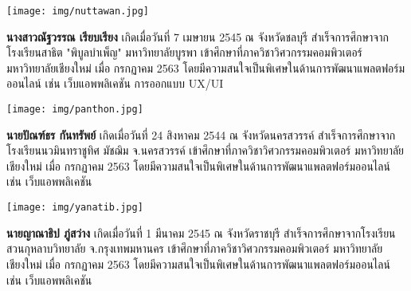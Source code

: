\documentclass[final]{cpecmu}
\author{นายญาณาธิป ภู่สว่าง}{Yanatip Bhoosawang}{630612097}
\author{นางสาวณัฐวรรณ เรียบเรียง}{Nuttawan Reabreang}{630612099}
\author{นายปัณฑ์ธร กันทรัพย์}{Panthon Kansap}{630612105}
\begin{document}


\pagestyle{empty}\cleardoublepage
\normalspacing \setcounter{page}{1}  \pagestyle{cpecmu}






\ifproject

\fi



\ifproject
\normalspacing
\appendix


\ifglossary\glossarypage\fi

\ifindex\indexpage\fi

\begin{biosketch}
\begin{center}
  \texttt{[image: img/nuttawan.jpg]}
\end{center}
\textbf{นางสาวณัฐวรรณ เรียบเรียง} เกิดเมื่อวันที่ 7 เมษายน 2545 ณ จังหวัดชลบุรี สําเร็จการศึกษาจากโรงเรียนสาธิต "พิบูลบำเพ็ญ" มหาวิทยาลัยบูรพา เข้าศึกษาที่ภาควิชาวิศวกรรมคอมพิวเตอร์ มหาวิทยาลัยเชียงใหม่ เมื่อ กรกฏาคม 2563 โดยมีความสนใจเป็นพิเศษในด้านการพัฒนาแพลตฟอร์มออนไลน์ เช่น เว็บแอพพลิเคชัน การออกแบบ UX/UI

\begin{center}
  \texttt{[image: img/panthon.jpg]}
\end{center}
\textbf{นายปัณฑ์ธร กันทรัพย์} เกิดเมื่อวันที่ 24 สิงหาคม 2544 ณ จังหวัดนครสวรรค์ สําเร็จการศึกษาจากโรงเรียนนวมินทราชูทิศ มัชฌิม จ.นครสวรรค์ เข้าศึกษาที่ภาควิชาวิศวกรรมคอมพิวเตอร์ มหาวิทยาลัยเชียงใหม่ เมื่อ กรกฏาคม 2563 โดยมีความสนใจเป็นพิเศษในด้านการพัฒนาแพลตฟอร์มออนไลน์ เช่น เว็บแอพพลิเคชัน

\begin{center}
  \texttt{[image: img/yanatib.jpg]}
\end{center}
\textbf{นายญาณาธิป ภู่สว่าง} เกิดเมื่อวันที่ 1 มีนาคม 2545 ณ จังหวัดราชบุรี สำเร็จการศึกษาจากโรงเรียนสวนกุหลาบวิทยาลัย จ.กรุงเทพมหานคร เข้าศึกษาที่ภาควิชาวิศวกรรมคอมพิวเตอร์ มหาวิทยาลัยเชียงใหม่ เมื่อ กรกฏาคม 2563 โดยมีความสนใจเป็นพิเศษในด้านการพัฒนาแพลตฟอร์มออนไลน์ เช่น เว็บแอพพลิเคชัน
\end{biosketch}
\fi %
\end{document}
